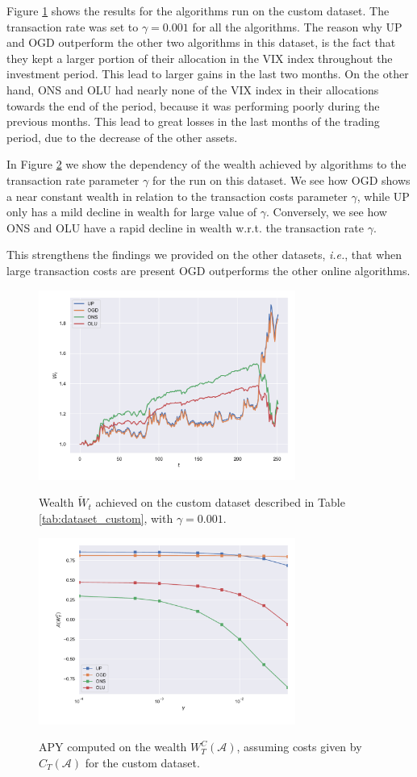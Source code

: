 Figure \ref{fig:wealth_custom} shows the results for the algorithms run on the custom dataset. The transaction rate was set to $\gamma=0.001$ for all the algorithms. The reason why UP and OGD outperform the other two algorithms in this dataset, is the fact that they kept a larger portion of their allocation in the VIX index throughout the investment period. This lead to larger gains in the last two months. On the other hand, ONS and OLU had nearly none of the VIX index in their allocations towards the end of the period, because it was performing poorly during the previous months. This lead to great losses in the last months of the trading period, due to the decrease of the other assets. 

In Figure \ref{fig:costs_custom} we show the dependency of the wealth achieved by algorithms to the transaction rate parameter $\gamma$ for the run on this dataset. We see how OGD shows a near constant wealth in relation to the transaction costs parameter $\gamma$, while UP only has a mild decline in wealth for large value of $\gamma$. Conversely, we see how ONS and OLU have a rapid decline in wealth w.r.t. the transaction rate $\gamma$.

This strengthens the findings we provided on the other datasets, \emph{i.e.}, that when large transaction costs are present OGD outperforms the other online algorithms.

\begin{figure}[ht!]
\centering
{\includegraphics[width=0.75\textwidth,keepaspectratio]{img/new_experiemnts_1920.pdf}} 
\caption{Wealth $\tilde W_t$ achieved on the custom dataset described in Table \ref{tab:dataset_custom}, with $\gamma=0.001$.}
\label{fig:wealth_custom}
\end{figure}

\begin{figure}[ht!]
\centering
{\includegraphics[width=0.75\textwidth,keepaspectratio]{img/new_experiemnts_1920_costs.pdf}} 
\caption{APY computed on the wealth $W_T^C(\mathcal A)$, assuming costs given by $C_T(\mathcal A)$ for the custom dataset.}
\label{fig:costs_custom}
\end{figure}
